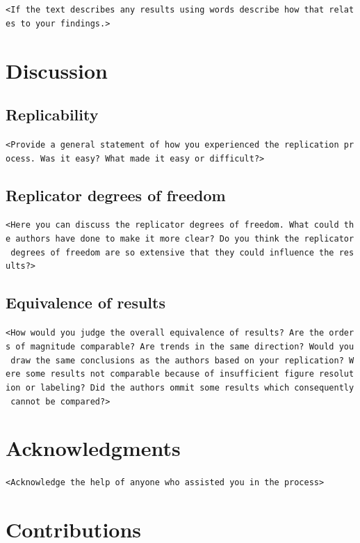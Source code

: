 \documentclass[10,a4paperpaper,]{article}
\begin{document}
\texttt{\textless{}If\ the\ text\ describes\ any\ results\ using\ words\ describe\ how\ that\ relates\ to\ your\ findings.\textgreater{}}

\FloatBarrier
\section{Discussion}

\subsection{Replicability}

\texttt{\textless{}Provide\ a\ general\ statement\ of\ how\ you\ experienced\ the\ replication\ process.\ Was\ it\ easy?\ What\ made\ it\ easy\ or\ difficult?\textgreater{}}

\subsection{Replicator degrees of freedom}

\texttt{\textless{}Here\ you\ can\ discuss\ the\ replicator\ degrees\ of\ freedom.\ What\ could\ the\ authors\ have\ done\ to\ make\ it\ more\ clear?\ Do\ you\ think\ the\ replicator\ degrees\ of\ freedom\ are\ so\ extensive\ that\ they\ could\ influence\ the\ results?\textgreater{}}

\subsection{Equivalence of results}

\texttt{\textless{}How\ would\ you\ judge\ the\ overall\ equivalence\ of\ results?\ Are\ the\ orders\ of\ magnitude\ comparable?\ Are\ trends\ in\ the\ same\ direction?\ Would\ you\ draw\ the\ same\ conclusions\ as\ the\ authors\ based\ on\ your\ replication?\ Were\ some\ results\ not\ comparable\ because\ of\ insufficient\ figure\ resolution\ or\ labeling?\ Did\ the\ authors\ ommit\ some\ results\ which\ consequently\ cannot\ be\ compared?\textgreater{}}

\section{Acknowledgments}

\texttt{\textless{}Acknowledge\ the\ help\ of\ anyone\ who\ assisted\ you\ in\ the\ process\textgreater{}}

\section{Contributions}
\end{document}
